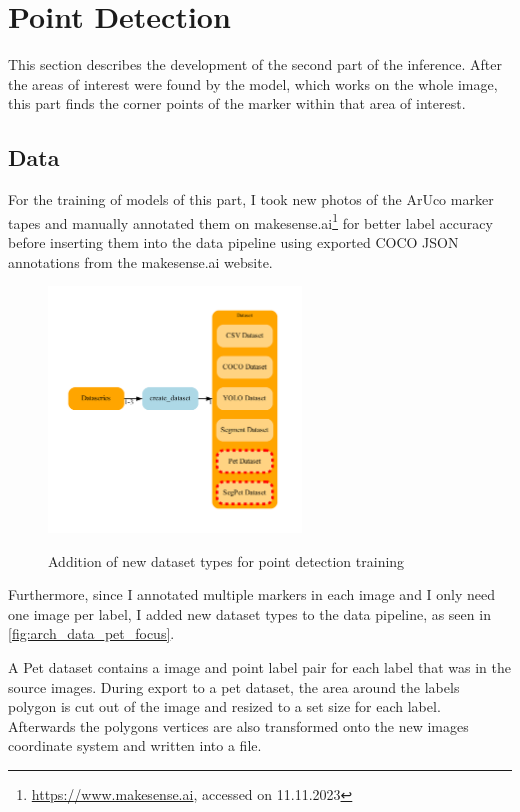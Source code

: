 \documentclass[10pt]{book}
\begin{document}
\section{Point Detection}

This section describes the development of the second part of the inference. After the areas of interest were found by the model, which works on the whole image, this part finds the corner points of the marker within that area of interest.

\subsection{Data}

For the training of models of this part, I took new photos of the \ac{ArUco} marker tapes and manually annotated them on makesense.ai\footnote{\url{https://www.makesense.ai}, accessed on 11.11.2023} for better label accuracy before inserting them into the data pipeline using exported \ac{COCO} \ac{JSON} annotations from the makesense.ai website.

\begin{figure}
  \caption{Addition of new dataset types for point detection training}
  \includegraphics[width=0.6\textwidth]{graph/arch_data_pet_focus}
  \label{fig:arch_data_pet_focus}
\end{figure}

Furthermore, since I annotated multiple markers in each image and I only need one image per label, I added new dataset types to the data pipeline, as seen in \autoref{fig:arch_data_pet_focus}. 

A Pet dataset contains a image and point label pair for each label that was in the source images. During export to a pet dataset, the area around the labels polygon is cut out of the image and resized to a set size for each label. Afterwards the polygons vertices are also transformed onto the new images coordinate system and written into a file. 
\end{document}
